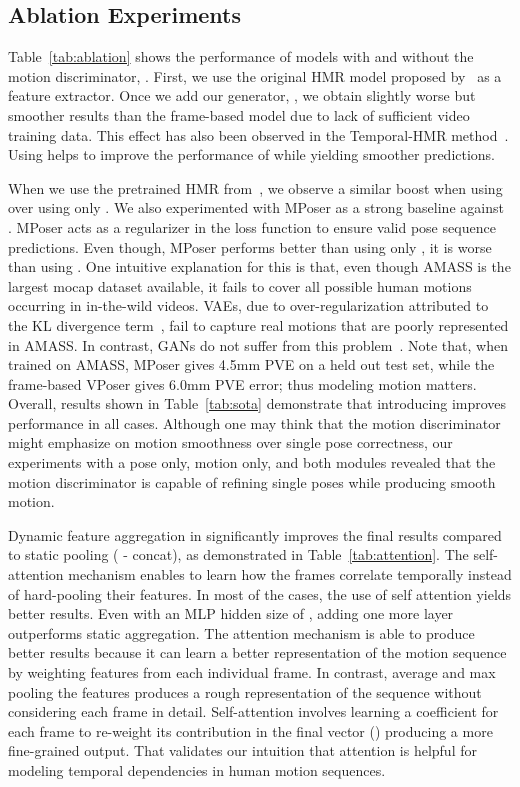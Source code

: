 \documentclass[10pt,twocolumn,letterpaper]{article}
\begin{document}
\subsection{Ablation Experiments}
Table~\ref{tab:ablation} shows the performance of models with and without the motion discriminator, . 
First, we use the original HMR model proposed by~\cite{kanazawa_hmr} as a feature extractor. Once we add our generator, , we obtain slightly worse but smoother results than the frame-based model due to lack of sufficient video training data. This effect has also been observed in the Temporal-HMR method~\cite{kanazawa_temporal_hmr}. Using  helps to improve the performance of  while yielding smoother predictions. 

When we use the pretrained HMR from~\cite{SPIN:ICCV:2019}, we observe a similar boost when using  over using only . We also experimented with MPoser as a strong baseline against . MPoser acts as a regularizer in the loss function to ensure valid pose sequence predictions. Even though, MPoser performs better than using only , it is worse than using . One intuitive explanation for this is that, even though AMASS is the largest mocap dataset available, it fails to cover all possible human motions occurring in in-the-wild videos. VAEs, due to over-regularization attributed to the KL divergence term~\cite{tolstikhin2017}, fail to capture real motions that are poorly represented in AMASS.
In contrast, GANs do not suffer from this problem~\cite{Ghoshetal19}. 
Note that, when trained on AMASS, MPoser gives 4.5mm PVE on a held out test set, while the frame-based  VPoser gives 6.0mm PVE error; thus modeling motion matters. 
Overall, results shown in Table~\ref{tab:sota} demonstrate that introducing  improves performance in all cases. Although one may think that the motion discriminator might emphasize on motion smoothness over single pose correctness, our experiments with a pose only, motion only, and both modules revealed that the motion discriminator is capable of refining single poses while producing smooth motion.


Dynamic feature aggregation in  significantly improves the final results compared to static pooling ( - concat), as demonstrated in Table~\ref{tab:attention}. The self-attention mechanism enables  to learn how the frames correlate temporally instead of hard-pooling their features. In most of the cases, the use of self attention yields better results. Even with an MLP hidden size of , adding one more layer outperforms static aggregation.
The attention mechanism is able to produce better results because it can learn a better representation of the motion sequence by weighting features from each individual frame. 
In contrast, average and max pooling the features produces a rough representation of the sequence without considering each frame in detail. 
Self-attention involves learning a coefficient for each frame to re-weight its contribution in the final vector () producing a more fine-grained output. That validates our intuition that attention is helpful for modeling temporal dependencies in human motion sequences.
\end{document}
